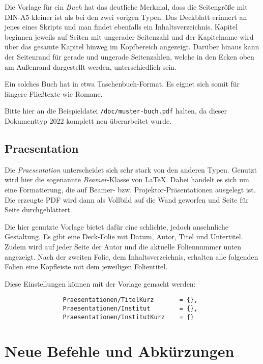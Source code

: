 				Die Vorlage für ein \emph{Buch} hat das deutliche Merkmal, dass die Seitengröße mit DIN-A5 kleiner ist als bei den zwei vorigen Typen. Das Deckblatt erinnert an jenes eines Skripts und man findet ebenfalls ein Inhaltsverzeichnis. Kapitel beginnen jeweils auf Seiten mit ungerader Seitenzahl und der Kapitelname wird über das gesamte Kapitel hinweg im Kopfbereich angezeigt. Darüber hinaus kann der Seitenrand für gerade und ungerade Seitenzahlen, welche in den Ecken oben am Außenrand dargestellt werden, unterschiedlich sein.

				Ein solches Buch hat in etwa Taschenbuch-Format. Es eignet sich somit für längere Fließtexte wie \zb Romane.

				\begin{redbox}
					Bitte hier an die Beispieldatei \texttt{/doc/muster-buch.pdf} halten, da dieser Dokumenttyp 2022 komplett neu überarbeitet wurde.
				\end{redbox}
			
			\subsection{Praesentation}

				Die \emph{Praesentation} unterscheidet sich sehr stark von den anderen Typen. Genutzt wird hier die sogenannte \emph{Beamer}-Klasse von \LaTeX{}. Dabei handelt es sich um eine Formatierung, die auf Beamer- bzw. Projektor-Präsentationen ausgelegt ist. Die erzeugte PDF wird dann als Vollbild auf die Wand geworfen und Seite für Seite durchgeblättert.

				Die hier genutzte Vorlage bietet dafür eine schlichte, jedoch ansehnliche Gestaltung. Es gibt eine Deck-Folie mit Datum, Autor, Titel und Untertitel. Zudem wird auf jeder Seite der Autor und die aktuelle Foliennummer unten angezeigt. Nach der zweiten Folie, dem Inhaltsverzeichnis, erhalten alle folgenden Folien eine Kopfleiste mit dem jeweiligen Folientitel.

				Diese Einstellungen können mit der Vorlage gemacht werden:

				\begin{verbatim}
				Praesentationen/TitelKurz       = {},
				Praesentationen/Institut        = {},
				Praesentationen/InstitutKurz    = {}
				\end{verbatim}

		\section{Neue Befehle und Abkürzungen}

